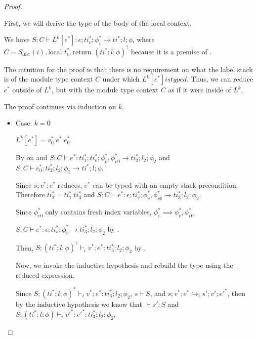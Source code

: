 \begin{proof}
\begin{itemize}
            First, we will derive the type of the body of the local context.

            We have $S;C \vdash L^k[e^{*}] : \epsilon;ti_v^{*};\phi_v^{*} \rightarrow ti^{*};l;\phi$, where
            $C = S_\text{inst}(i),\text{local } t_v^{*},\text{return } (ti^{*};l;\phi)^{?}$ because it is a premise of .

            The intuition for the proof is that there is no requirement on what the label stack is of the module type context $C$ under which $L^k[e^{*}] is typed$.
            Thus, we can reduce $e^{*}$ outside of $L^k$, but with the module type context $C$ as if it were inside of $L^k$.

            The proof continues via induction on $k$.
            \begin{itemize}
                \item Case: $k = 0$

                    $L^k[e^{*}] = v_0^{*}\; e^{*}\; e_0^{*}$.

                    By  on  and 
                    $S;C \vdash e^{*} : ti_1^{*};ti_v^{*};\phi_v^{*},\phi_{v0}^{*} \rightarrow ti_2^{*};l_2;\phi_2$ and
                    $S;C \vdash e_0^{*} : ti_2^{*};l_2;\phi_2 \rightarrow ti^{*};l;\phi$.

                    Since $s;v^{*};e^{*}$ reduces, $e^{*}$ can be typed with an empty stack precondition.
                    Therefore $ti_2^{*} = ti_1^{*}\;ti_3^{*}$ and $S;C \vdash e^{*} : \epsilon;ti_v^{*};\phi_v^{*},\phi_{v0}^{*} \rightarrow ti_3^{*};l_2;\phi_2$.

                    Since $\phi_{v0}^{*}$ only contains fresh index variables, $\phi_v^{*} \implies \phi_v^{*},\phi_{v0}^{*}$.

                    $S;C \vdash e^{*} : \epsilon;ti_v^{*};\phi_v^{*} \rightarrow ti_3^{*};l_2;\phi_2$ by .

                    Then, $S;(ti^{*};l;\phi)^{?} \vdash_i v^{*};e^{*} : ti_3^{*};l_2;\phi_2$ by .

                    Now, we invoke the  inductive hypothesis and rebuild the type using the reduced expression.

                    Since $S;(ti^{*};l;\phi)^{*} \vdash_i v^{*};e^{*} : ti_3^{*};l_2;\phi_2$, $s \vdash S$, and $s;v^{*};e^{*} \hookrightarrow_i s';v';e'^{*}$, then by the inductive hypothesis we know that $\vdash s' : S$ and $S;(ti^{*};l;\phi) \vdash_i v'^{*};e'^{*} : ti_3^{*};l_2;\phi_2$.


\end{itemize}
\end{itemize}
\end{proof}
